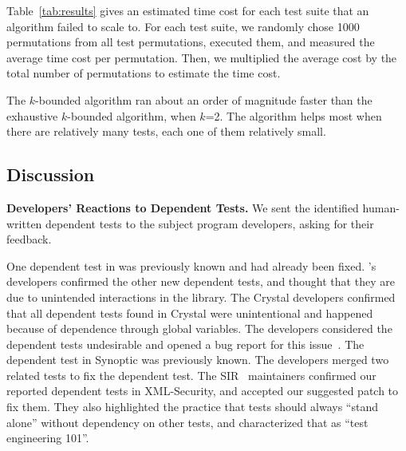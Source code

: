 Table~\ref{tab:results} gives an estimated time cost for each
test suite that an algorithm failed to scale to. For each test suite,
we randomly chose 1000 permutations from all
test permutations, executed them, and measured the average time cost
per permutation. Then, we multiplied
the average cost by the total number of permutations to estimate
the time cost.

The \dependenceaware{} $k$-bounded algorithm ran about
an order of magnitude faster
than the exhaustive $k$-bounded algorithm,  when $k$=2.
The \dependenceaware{} algorithm helps most when there are relatively many
tests, each one of them relatively small.






\subsection{Discussion}
\label{sec:expdiscussion}


\noindent \textbf{Developers' Reactions to Dependent Tests.}
We sent the identified human-written dependent tests to the
subject program developers, asking for their feedback.

One dependent test in \jt was previously known
and had already been fixed. \jt's
developers confirmed the other new dependent
tests, and thought that they are due to unintended interactions
in the library.
%
The Crystal developers confirmed that all dependent tests
found in Crystal were unintentional and happened because of dependence
through global variables. The developers considered the
dependent tests undesirable and opened a bug report for
this issue~\cite{crystalbugreport}.
%
The dependent test in Synoptic was previously known.
The developers merged two related tests to fix
the dependent test.
%
The SIR~\cite{sir} maintainers confirmed our reported dependent
tests in XML-Security, and accepted our
suggested patch to fix them. They also highlighted the practice
that tests should {always} ``stand alone''
without dependency on other tests, and characterized that as
``test engineering 101''. 


